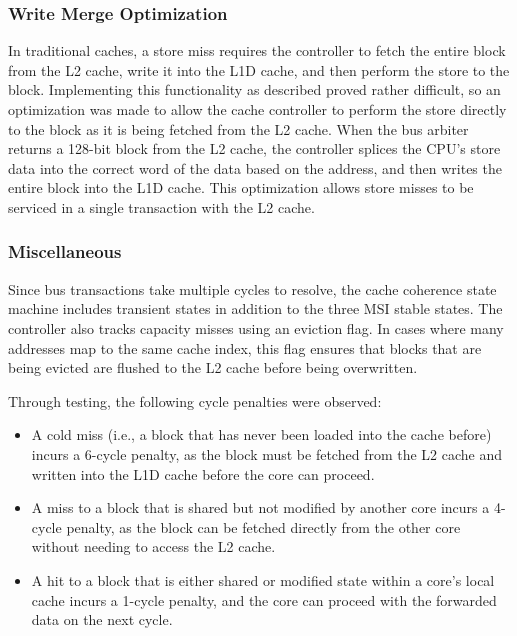 \documentclass[10pt, compsoc]{IEEEtran}
\begin{document}
\subsubsection*{Write Merge Optimization}

In traditional caches, a store miss requires the controller to fetch the entire block from the L2 cache, write it into the L1D cache, and then perform the store to the block. Implementing this functionality as described proved rather difficult, so an optimization was made to allow the cache controller to perform the store directly to the block as it is being fetched from the L2 cache. When the bus arbiter returns a 128-bit block from the L2 cache, the controller splices the CPU's store data into the correct word of the data based on the address, and then writes the entire block into the L1D cache. This optimization allows store misses to be serviced in a single transaction with the L2 cache. 



\subsubsection*{Miscellaneous}

Since bus transactions take multiple cycles to resolve, the cache coherence state machine includes transient states in addition to the three MSI stable states. The controller also tracks capacity misses using an eviction flag. In cases where many addresses map to the same cache index, this flag ensures that blocks that are being evicted are flushed to the L2 cache before being overwritten. 



Through testing, the following cycle penalties were observed:

\begin{itemize} 

    \item A cold miss (i.e., a block that has never been loaded into the cache before) incurs a 6-cycle penalty, as the block must be fetched from the L2 cache and written into the L1D cache before the core can proceed.

    \item A miss to a block that is shared but not modified by another core incurs a 4-cycle penalty, as the block can be fetched directly from the other core without needing to access the L2 cache.

    \item A hit to a block that is either shared or modified state within a core's local cache incurs a 1-cycle penalty, and the core can proceed with the forwarded data on the next cycle. 

\end{itemize}
\end{document}
